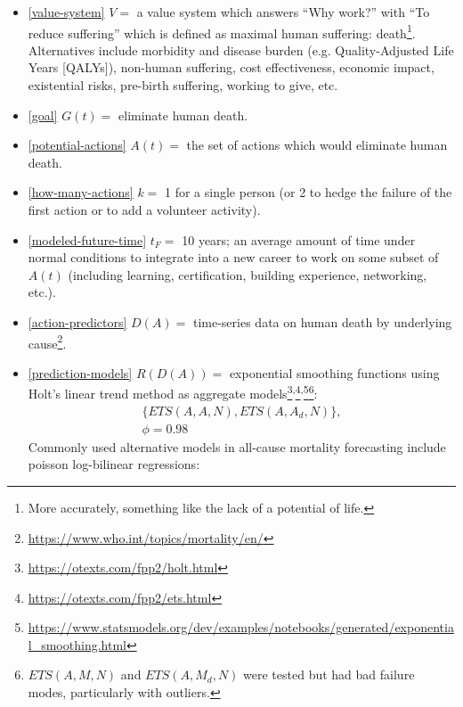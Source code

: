 \documentclass[12pt, a4paper, twocolumn]{article}
\begin{document}
\begin{itemize}
  \item \eqref{value-system} $V = $ a value system which answers \enquote{Why work?} with \enquote{To reduce suffering} which is defined as maximal human suffering: death\footnote{More accurately, something like the lack of a potential of life.}. Alternatives include morbidity and disease burden (e.g. Quality-Adjusted Life Years [QALYs]\cite{weinstein2009qalys,lopez2006global}), non-human suffering, cost effectiveness\cite{jamison2017disease,neumann2018comparing,givewellcosteffectiveness}, economic impact\cite{world2009guide}, existential risks\cite{bostrom2013existential}, pre-birth suffering, working to give\cite{macaskill2015doing}, etc.
  \item \eqref{goal} $G(t) = $ eliminate human death.
  \item \eqref{potential-actions} $A(t) = $ the set of actions which would eliminate human death.
  \item \eqref{how-many-actions} $k = $ 1 for a single person (or 2 to hedge the failure of the first action or to add a volunteer activity).
  \item \eqref{modeled-future-time} $t_F = $ 10 years; an average amount of time under normal conditions to integrate into a new career to work on some subset of $A(t)$ (including learning, certification, building experience, networking, etc.).
  \item \eqref{action-predictors} $D(A) = $ time-series data on human death by underlying cause\footnote{\scriptsize{\url{https://www.who.int/topics/mortality/en/}}}.
  \item \eqref{prediction-models} $R(D(A)) = $ exponential smoothing functions using Holt's linear trend method as aggregate models\footnote{\scriptsize{\url{https://otexts.com/fpp2/holt.html}}}\textsuperscript{,}\footnote{\scriptsize{\url{https://otexts.com/fpp2/ets.html}}}\textsuperscript{,}\footnote{\scriptsize{\url{https://www.statsmodels.org/dev/examples/notebooks/generated/exponential_smoothing.html}}}\footnote{$ETS(A,M,N)$ and $ETS(A,M_d,N)$ were tested but had bad failure modes, particularly with outliers.}:
    \begin{equation*}
      \begin{gathered}
        \{ETS(A,A,N),ETS(A,A_d,N)\},\\
        \phi=0.98
      \end{gathered}
    \end{equation*}
    Commonly used alternative models in all-cause mortality forecasting include poisson log-bilinear regressions:
    

\end{itemize}
\end{document}

